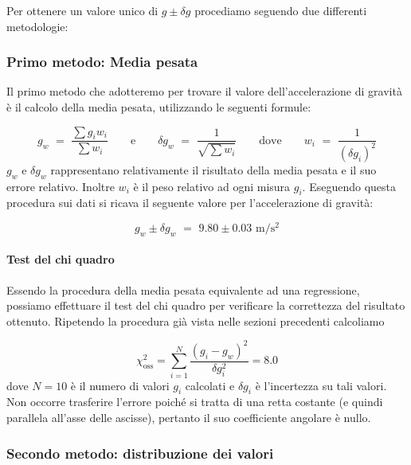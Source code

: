 Per ottenere un valore unico di $g \pm \delta g$ procediamo seguendo due differenti metodologie:

\subsubsection{Primo metodo: Media pesata}

Il primo metodo che adotteremo per trovare il valore dell'accelerazione di gravità è il calcolo della media pesata, utilizzando le seguenti formule:

\begin{equation*}
g_w \,\, = \,\, \frac{\sum g_iw_i}{\sum w_i} \quad\quad \text{e} \quad\quad \delta g_w \,\, = \,\, \frac{1}{\sqrt{\sum w_i}} \quad\quad \text{dove} \quad\quad w_i \,\, = \,\, \frac{1}{(\delta g_i)^2}
\end{equation*}
%
$g_w$ e $\delta g_w$ rappresentano relativamente il risultato della media pesata e il suo errore relativo. Inoltre $w_i$ è il peso relativo ad ogni misura $g_i$.
Eseguendo questa procedura sui dati si ricava il seguente valore per l'accelerazione di gravità:

\begin{equation}
g_w \pm \delta g_w \,\, = \,\, 9.80 \pm 0.03 \,\, \si{\metre\per\square\second}
\end{equation}

\paragraph{Test del chi quadro\\}

Essendo la procedura della media pesata equivalente ad una regressione, possiamo effettuare il test del chi quadro per verificare
la correttezza del risultato ottenuto. Ripetendo la procedura già vista nelle sezioni precedenti calcoliamo

\begin{equation}
    \chi^2_{\text{oss}} = \sum_{i=1}^N \frac{(g_i - g_w)^2}{\delta g_i^2} = 8.0
\end{equation}
%
dove $N = 10$ è il numero di valori $g_i$ calcolati e $\delta g_i$ è l'incertezza su tali valori. Non occorre trasferire
l'errore poiché si tratta di una retta costante (e quindi parallela all'asse delle ascisse), pertanto il suo coefficiente angolare
è nullo.

\subsubsection{Secondo metodo: distribuzione dei valori}

